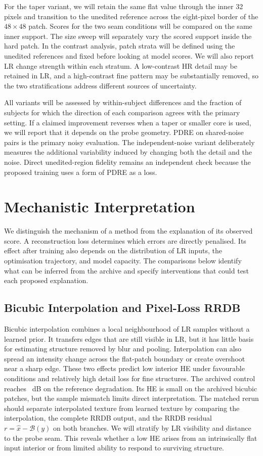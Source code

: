 \documentclass[journal]{IEEEtran}
\begin{document}
For the taper variant, we will retain the same flat value through the inner 32 pixels and transition to the unedited reference across the eight-pixel border of the $48\times48$ patch. Scores for the two seam conditions will be compared on the same inner support. The size sweep will separately vary the scored support inside the hard patch. In the contrast analysis, patch strata will be defined using the unedited references and fixed before looking at model scores. We will also report LR change strength within each stratum. A low-contrast HR detail may be retained in LR, and a high-contrast fine pattern may be substantially removed, so the two stratifications address different sources of uncertainty.

All variants will be assessed by within-subject differences and the fraction of subjects for which the direction of each comparison agrees with the primary setting. If a claimed improvement reverses when a taper or smaller core is used, we will report that it depends on the probe geometry. PDRE on shared-noise pairs is the primary noisy evaluation. The independent-noise variant deliberately measures the additional variability induced by changing both the detail and the noise. Direct unedited-region fidelity remains an independent check because the proposed training uses a form of PDRE as a loss.

\section{Mechanistic Interpretation}
\label{sec:mechanisms}
We distinguish the mechanism of a method from the explanation of its observed score. A reconstruction loss determines which errors are directly penalised. Its effect after training also depends on the distribution of LR inputs, the optimisation trajectory, and model capacity. The comparisons below identify what can be inferred from the archive and specify interventions that could test each proposed explanation.

\subsection{Bicubic Interpolation and Pixel-Loss RRDB}
Bicubic interpolation combines a local neighbourhood of LR samples without a learned prior. It transfers edges that are still visible in LR, but it has little basis for estimating structure removed by blur and pooling. Interpolation can also spread an intensity change across the flat-patch boundary or create overshoot near a sharp edge. These two effects predict low interior HE under favourable conditions and relatively high detail loss for fine structures. The archived control reaches \PSNRbic{}~dB on the reference degradation. Its HE is small on the archived bicubic patches, but the sample mismatch limits direct interpretation. The matched rerun should separate interpolated texture from learned texture by comparing the interpolation, the complete RRDB output, and the RRDB residual $r=\hat{x}-\mathcal{B}(y)$ on both branches. We will stratify by LR visibility and distance to the probe seam. This reveals whether a low HE arises from an intrinsically flat input interior or from limited ability to respond to surviving structure.
\end{document}
